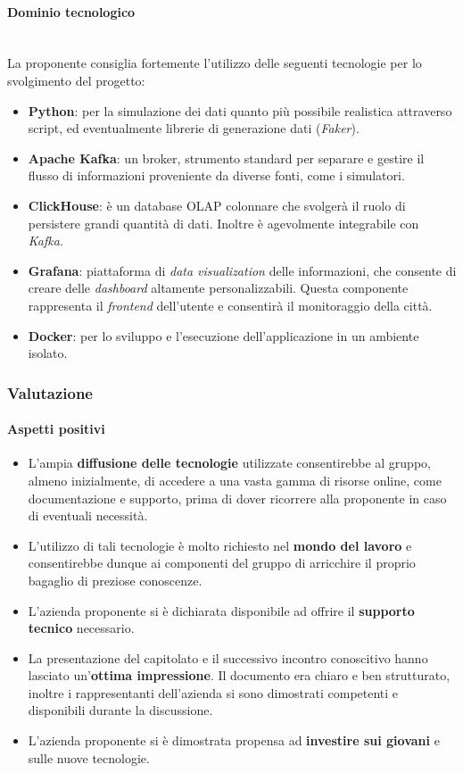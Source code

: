 \documentclass[italian,12pt]{article} %
\begin{document}
\paragraph{Dominio tecnologico}\mbox{}\\
La proponente consiglia fortemente l'utilizzo delle seguenti tecnologie per lo svolgimento del progetto:
\begin{itemize}
	\item\textbf{Python}: per la simulazione dei dati quanto più possibile realistica attraverso script, ed eventualmente librerie di generazione dati (\textit{Faker}).
	\item\textbf{Apache Kafka}: un broker, strumento standard per separare e gestire il flusso di informazioni proveniente da diverse fonti, come i simulatori.
	\item\textbf{ClickHouse}: è un database OLAP colonnare che svolgerà il ruolo di persistere grandi quantità di dati. Inoltre è agevolmente integrabile con \textit{Kafka}.
	\item\textbf{Grafana}: piattaforma di \textit{data visualization} delle informazioni, che consente di creare delle \textit{dashboard} altamente personalizzabili. Questa componente rappresenta il \textit{frontend} dell'utente e consentirà il monitoraggio della città.
	\item\textbf{Docker}: per lo sviluppo e l'esecuzione dell'applicazione in un ambiente isolato.
\end{itemize}

\subsubsection{Valutazione}
\paragraph{Aspetti positivi}
\begin{itemize}
	\item L'ampia \textbf{diffusione delle tecnologie} utilizzate consentirebbe al gruppo, almeno inizialmente, di accedere a una vasta gamma di risorse online, come documentazione e supporto, prima di dover ricorrere alla proponente in caso di eventuali necessità.
	\item L'utilizzo di tali tecnologie è molto richiesto nel \textbf{mondo del lavoro} e consentirebbe dunque ai componenti del gruppo di arricchire il proprio bagaglio di preziose conoscenze.
	\item L'azienda proponente si è dichiarata disponibile ad offrire il \textbf{supporto tecnico} necessario.
	\item La presentazione del capitolato e il successivo incontro conoscitivo hanno lasciato un'\textbf{ottima impressione}. Il documento era chiaro e ben strutturato, inoltre i rappresentanti dell'azienda si sono dimostrati competenti e disponibili durante la discussione.
	\item L'azienda proponente si è dimostrata propensa ad \textbf{investire sui giovani} e sulle nuove tecnologie.
\end{itemize}
\end{document}

